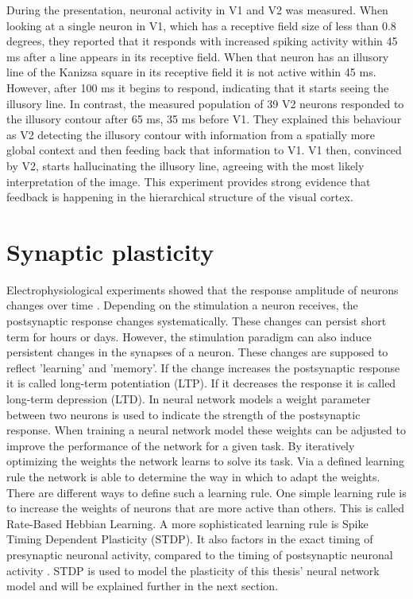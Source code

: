 During the presentation, neuronal activity in V1 and V2 was measured. When looking at a single neuron in V1, which has a receptive field size of less than 0.8 degrees, they reported that it responds with increased spiking activity within 45 ms after a line appears in its receptive field. When that neuron has an illusory line of the Kanizsa square in its receptive field it is not active within 45 ms. However, after 100 ms it begins to respond, indicating that it starts seeing the illusory line. In contrast, the measured population of 39 V2 neurons responded to the illusory contour after 65 ms, 35 ms before V1. They explained this behaviour as V2 detecting the illusory contour with information from a spatially more global context and then feeding back that information to V1. V1 then, convinced by V2, starts hallucinating the illusory line, agreeing with the most likely interpretation of the image. This experiment provides strong evidence that feedback is happening in the hierarchical structure of the visual cortex.

\section{Synaptic plasticity}

Electrophysiological experiments showed that the response amplitude of neurons changes over time \citep{STDPEvidence}. Depending on the stimulation a neuron receives, the postsynaptic response changes systematically. These changes can persist short term for hours or days. However, the stimulation paradigm can also induce persistent changes in the synapses of a neuron. These changes are supposed to reflect 'learning' and 'memory'. If the change increases the postsynaptic response it is called long-term potentiation (LTP). If it decreases the response it is called long-term depression (LTD).
In neural network models a weight parameter between two neurons is used to indicate the strength of the postsynaptic response. When training a neural network model these weights can be adjusted to improve the performance of the network for a given task. By iteratively optimizing the weights the network learns to solve its task. Via a defined learning rule the network is able to determine the way in which to adapt the weights. There are different ways to define such a learning rule. One simple learning rule is to increase the weights of neurons that are more active than others. This is called Rate-Based Hebbian Learning. A more sophisticated learning rule  is Spike Timing Dependent Plasticity (STDP). It also factors in the exact timing of presynaptic neuronal activity, compared to the timing of postsynaptic neuronal activity \citep{SpikingNeuronModelsBook}. STDP is  used to model the plasticity of this thesis' neural network model and will be explained further in the next section.


